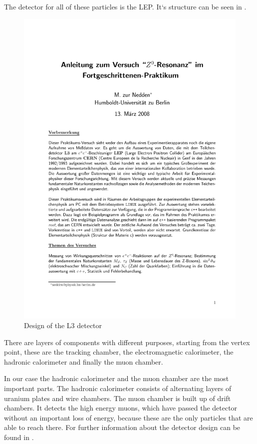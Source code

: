 \documentclass[epj,nopacs]{svjour}
\begin{document}
The detector for all of these particles is the LEP. It`s structure can be seen
in .
\begin{figure}[htb]
 \centering
 \includegraphics[page=5,viewport=286 620 508 765,clip,%
  width=\columnwidth,keepaspectratio]{../../Z0/docs/Z0ResFprakt}
 \caption{Design of the L3 detector\cite{script}}
 \label{fig:aufbau}
\end{figure}
There are layers of components with different purposes, starting from the
vertex point, these are the tracking chamber, the electromagnetic calorimeter,
the hadronic calorimeter and finally the muon chamber.

In our case the hadronic calorimeter and the muon chamber are the most
important parts. The hadronic calorimeter consists of alternating layers of
uranium plates and wire chambers. The muon chamber is built up of drift
chambers. It detects the high energy muons, which have passed the detector
without an important loss of energy, because these are the only particles that
are able to reach there. For further information about the detector design can
be found in \cite{script}.
\end{document}
